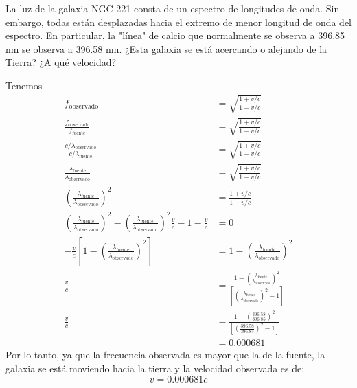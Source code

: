 \begin{problema}
    La luz de la galaxia NGC 221 consta de un espectro de longitudes de onda. Sin embargo, todas están desplazadas hacia el extremo de menor longitud de onda del espectro. En particular, la "línea" de calcio que normalmente se observa a 396.85 nm se observa a 396.58 nm. ¿Esta galaxia se está acercando o alejando de la Tierra? ¿A qué velocidad? 
    \begin{sol}
        Tenemos 
        \begin{align*}
            f_{\text{observado}} & =\sqrt{\frac{1+v/c}{1-v/c}}\\
            \frac{f_{\text{observado}}}{ f_{\text{fuente}}}&= \sqrt{\frac{1+v/c}{1-v/c}}\\
            \frac{c/\lambda_{\text{observado}}}{c/\lambda_{\text{fuente}}}&= \sqrt{\frac{1+v/c}{1-v/c}}\\
            \frac{\lambda_{\text{fuente}}}{\lambda_{\text{observado}}}&= \sqrt{\frac{1+v/c}{1-v/c}}\\
            \left(\frac{\lambda_{\text{fuente}}}{\lambda_{\text{observado}}}\right)^2&= 
            \frac{1+v/c}{1-v/c}\\
            \left(\frac{\lambda_{\text{fuente}}}{\lambda_{\text{observado}}}\right)^2 -\left(\frac{\lambda_{\text{fuente}}}{\lambda_{\text{observado}}}\right)^2\frac{v}{c}-1-\frac{v}{c} &=0\\
            -\frac{v}{c}\left[1-\left(\frac{\lambda_{\text{fuente}}}{\lambda_{\text{observado}}}\right)^2 \right] &= 1 - \left(\frac{\lambda_{\text{fuente}}}{\lambda_{\text{observado}}}\right)^2\\
            \frac{v}{c}&=\frac{1 - \left(\frac{\lambda_{\text{fuente}}}{\lambda_{\text{observado}}}\right)^2}{\left[\left(\frac{\lambda_{\text{fuente}}}{\lambda_{\text{observado}}}\right)^2 -1\right]}\\
            \frac{v}{c} &= \frac{1 - \left(\frac{396.58}{396.85}\right)^2}{\left[\left(\frac{396.58}{396.85}\right)^2 -1\right]}\\
            &= 0.000681
        \end{align*}
        Por lo tanto, ya que la frecuencia observada es mayor que la de la fuente, la galaxia se está moviendo hacia la tierra y la velocidad observada es de: 
$$v = 0.000681c$$

    \end{sol}
\end{problema}


